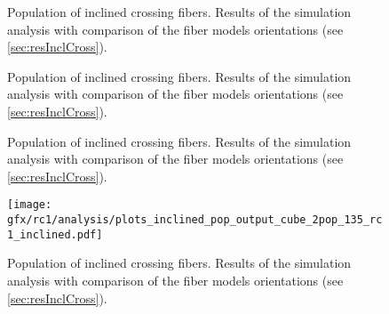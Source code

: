 %
\begin{figure}[!p]
\centering
{}
\caption{Population of inclined crossing fibers. Results of the simulation analysis with comparison of the fiber models orientations (see \cref{sec:resInclCross}).}
\label{app:incl_fiber_pop_b}
\end{figure}
%
\begin{figure}[!p]
\centering
{}
\caption{Population of inclined crossing fibers. Results of the simulation analysis with comparison of the fiber models orientations (see \cref{sec:resInclCross}).}
\label{app:incl_fiber_pop_c}
\end{figure}
%
\begin{figure}[!p]
\centering
{}
\caption{Population of inclined crossing fibers. Results of the simulation analysis with comparison of the fiber models orientations (see \cref{sec:resInclCross}).}
\label{app:incl_fiber_pop_d}
\end{figure}
%
\begin{figure}[!p]
\centering
\texttt{[image: gfx/rc1/analysis/plots\_inclined\_pop\_output\_cube\_2pop\_135\_rc1\_inclined.pdf]}
\caption{Population of inclined crossing fibers. Results of the simulation analysis with comparison of the fiber models orientations (see \cref{sec:resInclCross}).}
\label{app:incl_fiber_pop_e}
\end{figure}